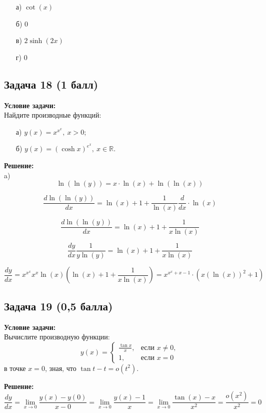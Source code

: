 \documentclass[a4paper,12pt]{article}
\begin{document}
\begin{itemize}
    \item[а)] $\cot(x)$
    \item[б)] $0$
    \item[в)] $2\sinh(2x)$
    \item[г)] $0$
\end{itemize}


\vspace{1cm}

\subsection{Задача 18 (1 балл)}
\textbf{Условие задачи:} \\
Найдите производные функций:
\begin{itemize}
    \item[а)] \( y(x) = x^{x^x}, \ x > 0 \);
    \item[б)] \( y(x) = (\cosh x)^{e^x}, \ x \in \mathbb{R} \).
\end{itemize}

\textbf{Решение:} \\
a)
\[
\ln(\ln(y)) = x \cdot \ln(x) + \ln(\ln(x))
\]

\[
\frac{d\ln(\ln(y))}{dx} = \ln(x) + 1 + \frac{1}{\ln(x)} \frac{d}{dx} \cdot \ln(x)
\]

\[
\frac{d\ln(\ln(y))}{dx} = \ln(x) + 1 + \frac{1}{x\ln(x)}
\]

\[
\frac{dy}{dx}\frac{1}{y\ln(y)} = \ln(x) + 1 + \frac{1}{x\ln(x)}
\]

\[
\frac{dy}{dx} = x^{x^x}x^x\ln(x)(\ln(x)+1+\frac{1}{x\ln(x)}) = x^{x^x+x-1}\cdot (x(\ln(x))^2+1)
\]


\vspace{1cm}

\subsection{Задача 19 (0,5 балла)}
\textbf{Условие задачи:} \\
Вычислите производную функции:
\[
y(x) = \begin{cases}
\frac{\tan x}{x}, & \text{если } x \neq 0, \\
1, & \text{если } x = 0
\end{cases}
\]
в точке \( x = 0 \), зная, что \( \tan t - t = o(t^2) \).

\textbf{Решение:} \\

\[
\frac{dy}{dx} =\lim_{x \to 0} \frac{y(x) - y(0)}{x - 0} = \lim_{x \to 0} \frac{y(x)-1}{x} = \lim_{x \to 0} \frac{\tan(x) - x}{x^2} = \frac{o(x^2)}{x^2} = 0
\]
\end{document}

